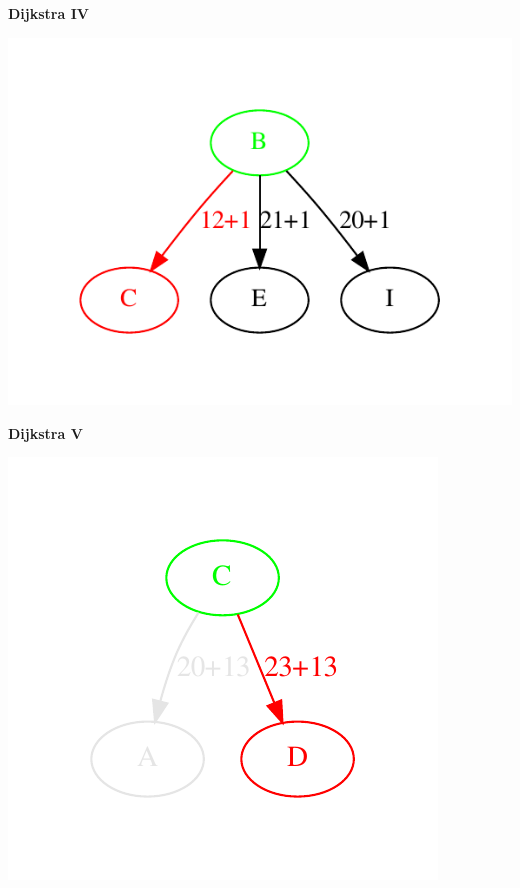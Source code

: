 \newpage
{\samepage
\begin{center}
{\Large{\bf Dijkstra IV}}
\end{center}
\begin{center}
\includegraphics[width=\textwidth]{../Images/dijkstra2.pdf}
\end{center}
}

\newpage
{\samepage
\begin{center}
{\Large{\bf Dijkstra V}}
\end{center}
\begin{center}
\includegraphics[width=\textwidth]{../Images/dijkstra3.pdf}
\end{center}
}


